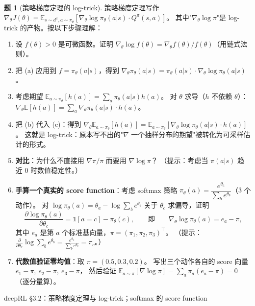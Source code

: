 \documentclass[11pt,a4paper]{article}
\theoremstyle{definition}
\newtheorem{problem}{题}
\begin{document}
\begin{problem}[策略梯度定理的 log-trick]
策略梯度定理写作
$\nabla_\theta J(\theta) = \mathbb{E}_{s \sim d^\pi, a \sim \pi_\theta}[\nabla_\theta \log \pi_\theta(a|s) \cdot Q^\pi(s,a)]$。
其中"$\nabla_\theta \log \pi$"是 log-trick 的产物。按以下步骤理解：

\begin{enumerate}[label=(\alph*)]
    \item 设 $f(\theta) > 0$ 是可微函数。证明 $\nabla_\theta \log f(\theta) = \nabla_\theta f(\theta) / f(\theta)$（用链式法则）。
    \item 把 (a) 应用到 $f = \pi_\theta(a|s)$，得到
    $\nabla_\theta \pi_\theta(a|s) = \pi_\theta(a|s) \cdot \nabla_\theta \log \pi_\theta(a|s)$。
    \item 考虑期望 $\mathbb{E}_{a \sim \pi_\theta}[h(a)] = \sum_a \pi_\theta(a|s) h(a)$。
    对 $\theta$ 求导（$h$ 不依赖 $\theta$）：
    $\nabla_\theta \mathbb{E}[h(a)] = \sum_a \nabla_\theta \pi_\theta(a|s) \cdot h(a)$。
    \item 把 (b) 代入 (c)：得到
    $\nabla_\theta \mathbb{E}_{a \sim \pi_\theta}[h(a)] = \mathbb{E}_{a \sim \pi_\theta}[\nabla_\theta \log \pi_\theta(a|s) \cdot h(a)]$。
    这就是 log-trick：原本写不出的"$\nabla$ 一个抽样分布的期望"被转化为可采样估计的形式。
    \item \textbf{对比}：为什么不直接用 $\nabla \pi / \pi$ 而要用 $\nabla \log \pi$？
    （提示：考虑当 $\pi(a|s)$ 趋近 0 时数值稳定性。）
    \item \textbf{手算一个真实的 score function}：考虑 softmax 策略
    $\pi_\theta(a) = \dfrac{e^{\theta_a}}{\sum_b e^{\theta_b}}$（$3$ 个动作）。
    对 $\log \pi_\theta(a) = \theta_a - \log\sum_b e^{\theta_b}$ 关于 $\theta_c$ 求偏导，证明
    \[
    \frac{\partial \log \pi_\theta(a)}{\partial \theta_c} = \mathbb{1}[a = c] - \pi_\theta(c),
    \qquad\text{即}\qquad
    \nabla_\theta \log \pi_\theta(a) = e_a - \pi,
    \]
    其中 $e_a$ 是第 $a$ 个标准基向量，$\pi = (\pi_1, \pi_2, \pi_3)^\top$。
    （提示：$\frac{\partial}{\partial\theta_c}\log\sum_b e^{\theta_b} = \frac{e^{\theta_c}}{\sum_b e^{\theta_b}} = \pi_c$。）
    \item \textbf{代数值验证零均值}：取 $\pi = (0.5, 0.3, 0.2)$。
    写出三个动作各自的 score 向量 $e_1 - \pi,\ e_2 - \pi,\ e_3 - \pi$，
    然后验证 $\mathbb{E}_{a\sim\pi}[\nabla\log\pi] = \sum_a \pi_a (e_a - \pi) = 0$（逐分量算）。
\end{enumerate}
\begin{topicbox}
deepRL §3.2：策略梯度定理与 log-trick；softmax 的 score function

\end{topicbox}
\end{problem}
\end{document}
